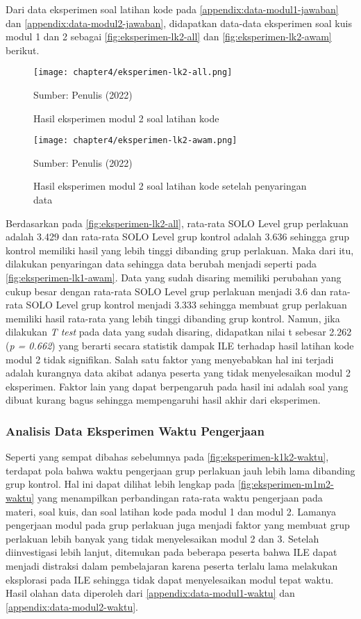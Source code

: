 Dari data eksperimen soal latihan kode pada \autoref{appendix:data-modul1-jawaban} dan \autoref{appendix:data-modul2-jawaban}, didapatkan data-data eksperimen soal kuis modul 1 dan 2 sebagai \autoref{fig:eksperimen-lk2-all} dan \autoref{fig:eksperimen-lk2-awam} berikut.

\begin{figure}[H]
  \centering
  \texttt{[image: chapter4/eksperimen-lk2-all.png]}
  \caption{Hasil eksperimen modul 2 soal latihan kode} \label{fig:eksperimen-lk2-all}
  Sumber: Penulis (2022)
\end{figure}
\begin{figure}[H]
  \centering
  \texttt{[image: chapter4/eksperimen-lk2-awam.png]}
  \caption{Hasil eksperimen modul 2 soal latihan kode setelah penyaringan data} \label{fig:eksperimen-lk2-awam}
  Sumber: Penulis (2022)
\end{figure}

Berdasarkan pada \autoref{fig:eksperimen-lk2-all}, rata-rata SOLO Level grup perlakuan adalah 3.429 dan rata-rata SOLO Level grup kontrol adalah 3.636 sehingga grup kontrol memiliki hasil yang lebih tinggi dibanding grup perlakuan. Maka dari itu, dilakukan penyaringan data sehingga data berubah menjadi seperti pada \autoref{fig:eksperimen-lk1-awam}. Data yang sudah disaring memiliki perubahan yang cukup besar dengan rata-rata SOLO Level grup perlakuan menjadi 3.6 dan rata-rata SOLO Level grup kontrol menjadi 3.333 sehingga membuat grup perlakuan memiliki hasil rata-rata yang lebih tinggi dibanding grup kontrol. Namun, jika dilakukan \textit{T test} pada data yang sudah disaring, didapatkan nilai t sebesar 2.262 (\textit{p = 0.662}) yang berarti secara statistik dampak ILE terhadap hasil latihan kode modul 2 tidak signifikan. Salah satu faktor yang menyebabkan hal ini terjadi adalah kurangnya data akibat adanya peserta yang tidak menyelesaikan modul 2 eksperimen. Faktor lain yang dapat berpengaruh pada hasil ini adalah soal yang dibuat kurang bagus sehingga mempengaruhi hasil akhir dari eksperimen.

\subsubsection{Analisis Data Eksperimen Waktu Pengerjaan}
Seperti yang sempat dibahas sebelumnya pada \autoref{fig:eksperimen-k1k2-waktu}, terdapat pola bahwa waktu pengerjaan grup perlakuan jauh lebih lama dibanding grup kontrol. Hal ini dapat dilihat lebih lengkap pada \autoref{fig:eksperimen-m1m2-waktu} yang menampilkan perbandingan rata-rata waktu pengerjaan pada materi, soal kuis, dan soal latihan kode pada modul 1 dan modul 2. Lamanya pengerjaan modul pada grup perlakuan juga menjadi faktor yang membuat grup perlakuan lebih banyak yang tidak menyelesaikan modul 2 dan 3. Setelah diinvestigasi lebih lanjut, ditemukan pada beberapa peserta bahwa ILE dapat menjadi distraksi dalam pembelajaran karena peserta terlalu lama melakukan eksplorasi pada ILE sehingga tidak dapat menyelesaikan modul tepat waktu. Hasil olahan data diperoleh dari \autoref{appendix:data-modul1-waktu} dan \autoref{appendix:data-modul2-waktu}.


